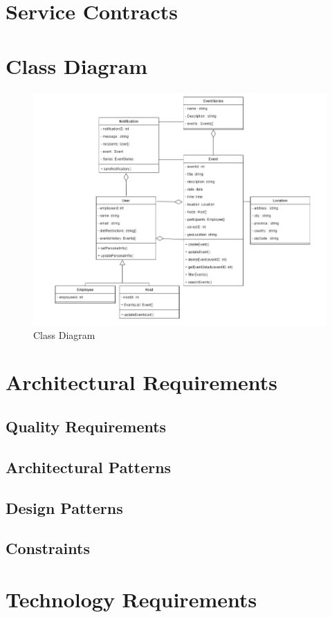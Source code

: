 \documentclass[a4paper,12pt]{article}
\begin{document}
\section{Service Contracts}
\label{sec:service-contracts}

\section{Class Diagram}
\label{sec:class-diagram}
\label{sec:class-diagram}
\begin{figure}[H]
    \centering
    \includegraphics[width=\textwidth]{EventsClassDiagram.png}
    \caption{Class Diagram}
    \label{fig:class-diagram}
\end{figure}

\section{Architectural Requirements}
\label{sec:architectural-requirements}

\subsection{Quality Requirements}
\label{subsec:quality-requirements}

\subsection{Architectural Patterns}
\label{subsec:architectural-patterns}

\subsection{Design Patterns}
\label{subsec:design-patterns}

\subsection{Constraints}
\label{subsec:constraints}

\section{Technology Requirements}
\label{sec:technology-requirements}
\end{document}
